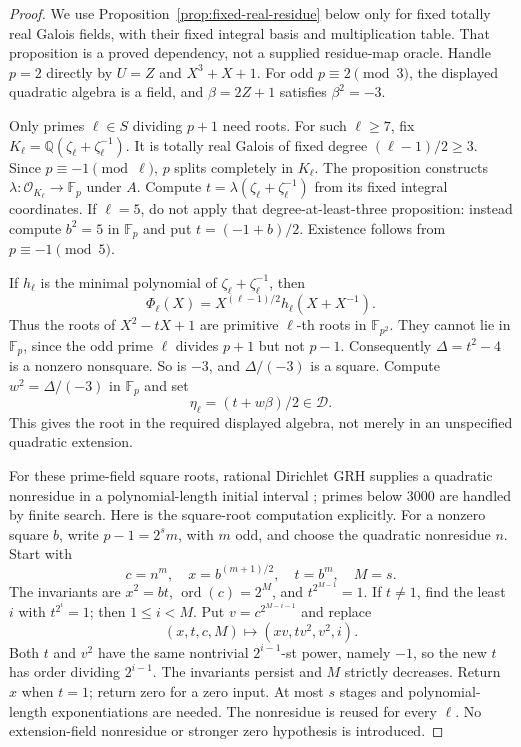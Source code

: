 \documentclass[11pt]{article}
\theoremstyle{definition}
\theoremstyle{remark}
\begin{document}
\begin{proof}
We use Proposition~\ref{prop:fixed-real-residue} below only for
fixed totally real Galois fields, with their fixed integral basis
and multiplication table. That proposition is a proved dependency,
not a supplied residue-map oracle. Handle \(p=2\) directly by
\(U=Z\) and \(X^3+X+1\). For odd \(p\equiv2\pmod3\),
the displayed quadratic algebra is a field, and
\(\beta=2Z+1\) satisfies \(\beta^2=-3\).

Only primes \(\ell\in S\) dividing \(p+1\) need roots.
For such \(\ell\ge7\), fix
\(K_\ell=\mathbb Q(\zeta_\ell+\zeta_\ell^{-1})\).
It is totally real Galois of fixed degree \((\ell-1)/2\ge3\).
Since \(p\equiv-1\pmod\ell\), \(p\) splits completely in
\(K_\ell\). The proposition constructs
\(\lambda:\mathcal O_{K_\ell}\to\mathbb F_p\) under \(A\).
Compute \(t=\lambda(\zeta_\ell+\zeta_\ell^{-1})\) from its
fixed integral coordinates. If \(\ell=5\), do not apply that
degree-at-least-three proposition: instead compute \(b^2=5\)
in \(\mathbb F_p\) and put \(t=(-1+b)/2\).
Existence follows from \(p\equiv-1\pmod5\).

If \(h_\ell\) is the minimal polynomial of
\(\zeta_\ell+\zeta_\ell^{-1}\), then
\[
 \Phi_\ell(X)=X^{(\ell-1)/2}h_\ell(X+X^{-1}).
\]
Thus the roots of \(X^2-tX+1\) are primitive \(\ell\)-th
roots in \(\mathbb F_{p^2}\). They cannot lie in \(\mathbb F_p\),
since the odd prime \(\ell\) divides \(p+1\) but not \(p-1\).
Consequently \(\Delta=t^2-4\) is a nonzero nonsquare.
So is \(-3\), and \(\Delta/(-3)\) is a square. Compute
\(w^2=\Delta/(-3)\) in \(\mathbb F_p\) and set
\[
                         \eta_\ell=(t+w\beta)/2\in\mathcal D.
\]
This gives the root in the required displayed algebra, not merely
in an unspecified quadratic extension.

For these prime-field square roots, rational Dirichlet GRH supplies
a quadratic nonresidue in a polynomial-length initial interval
\citep[Theorem~1.1(2), corrected author p.~2]{LLS2015}; primes
below 3000 are handled by finite search. Here is the square-root computation explicitly. For a nonzero square
\(b\), write \(p-1=2^s m\), with \(m\) odd, and choose the
quadratic nonresidue \(n\). Start with
\[
 c=n^m,\quad x=b^{(m+1)/2},\quad t=b^m,\quad M=s.
\]
The invariants are \(x^2=bt\), \(\operatorname{ord}(c)=2^M\),
and \(t^{2^{M-1}}=1\). If \(t\ne1\), find the least \(i\)
with \(t^{2^i}=1\); then \(1\le i<M\). Put
\(v=c^{2^{M-i-1}}\) and replace
\[
              (x,t,c,M)\longmapsto(xv,tv^2,v^2,i).
\]
Both \(t\) and \(v^2\) have the same nontrivial
\(2^{i-1}\)-st power, namely \(-1\), so the new \(t\) has
order dividing \(2^{i-1}\). The invariants persist and \(M\)
strictly decreases. Return \(x\) when \(t=1\); return zero for
a zero input. At most \(s\) stages and polynomial-length
exponentiations are needed. The nonresidue is reused for every
\(\ell\). No extension-field nonresidue or
stronger zero hypothesis is introduced.


\end{proof}
\end{document}
